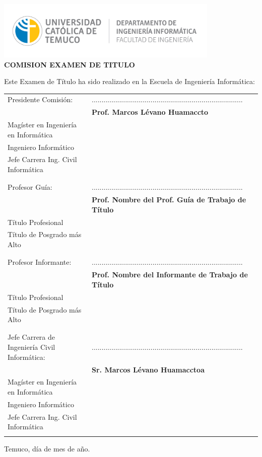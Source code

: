 \begin{center}
\vspace*{-9\baselineskip}
\hspace*{-0.1\textwidth}
\includegraphics[width=0.8\textwidth]{images/Logo_depto_ing_informatica.png}\nonumber\\
\textbf{COMISION EXAMEN DE TITULO}
\par\end{center}

Este Examen de Título ha sido realizado en la Escuela de Ingeniería Informática:
\vspace{0.4cm}

\begin{tabular}{>{\raggedright}p{}>{\centering}p{}}
Presidente Comisión: & .............................................................................\tabularnewline
 & \textbf{Prof. Marcos Lévano Huamaccto}\\
Magíster en Ingeniería en Informática\\
Ingeniero Informático\\
Jefe Carrera Ing. Civil Informática\tabularnewline
 & \tabularnewline
 & \tabularnewline
Profesor Guía: & .............................................................................\tabularnewline
 & \textbf{Prof. Nombre del Prof. Guía de Trabajo de Título}\\
Título Profesional \\
Título de Posgrado más Alto \tabularnewline
 & \tabularnewline
 & \tabularnewline
Profesor Informante: & .............................................................................\tabularnewline
 & \textbf{Prof. Nombre del Informante de Trabajo de Título}\\
Título Profesional \\
Título de Posgrado más Alto\tabularnewline
 & \tabularnewline
 & \tabularnewline
Jefe Carrera de Ingeniería Civil Informática: & .............................................................................\tabularnewline
 & \textbf{Sr. Marcos Lévano Huamacctoa}\\
Magíster en Ingeniería en Informática\\
Ingeniero Informático\\
Jefe Carrera Ing. Civil Informática\tabularnewline
\vspace{8mm}
\end{tabular}
Temuco, día de mes de año.\\

